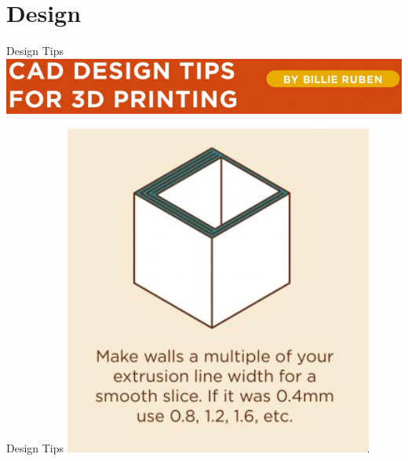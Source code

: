 \documentclass{presentation}
\begin{document}
\section{Design}

\begin{frame}{Design Tips}
  \includegraphics[width=\textwidth]{./design-tips.jpg}
\end{frame}

\begin{frame}{Design Tips}
  \centering
  \includegraphics[width=\textwidth/2]{./multiple.jpg}
\end{frame}
\end{document}
